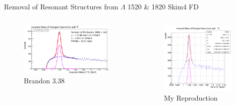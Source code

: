 \documentclass[aspectratio=169]{beamer}
\begin{document}
\begin{frame}{Removal of Resonant Structures from $\Lambda$ 1520 \& 1820  \hfill Skim4 FD}
\vspace*{-0.6cm}
    \begin{columns}
    \begin{figure}
        \centering
        \includegraphics[width=0.94\textwidth]{brandon_figs/38.png}
        \caption{Brandon 3.38}
    \end{figure}
    \begin{figure}
        \centering
        \includegraphics[width=0.97\textwidth]{pdfs/38.png}
        \caption{My Reproduction}
    \end{figure}
    \end{columns}
\end{frame}
\end{document}
